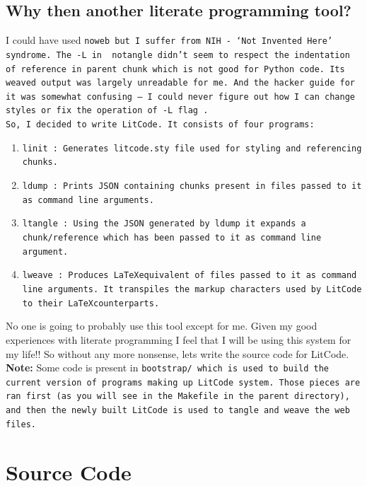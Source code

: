 \subsection{Why then another literate programming tool?}

I could have used \tt noweb \rm but I suffer from NIH - `Not Invented Here' syndrome. The \tt -L \rm in \tt
notangle \rm didn't seem to respect the indentation of reference in parent chunk which is not good for Python
code. Its weaved output was largely unreadable for me. And the hacker guide for it was somewhat confusing ---
I could never figure out how I can change styles or fix the operation of \tt -L \rm
flag \cite{ramsey1992noweb}.\\

So, I decided to write LitCode. It consists of four programs:
\begin{enumerate}
    \item \tt linit \rm: Generates \tt litcode.sty \rm file used for styling and referencing chunks.
    \item \tt ldump \rm: Prints JSON containing chunks present in files passed to it as command line
    arguments.
    \item \tt ltangle \rm: Using the JSON generated by \tt ldump \rm it expands a chunk/reference which has
    been passed to it as command line argument.
    \item \tt lweave \rm: Produces \LaTeX equivalent of files passed to it as command line arguments. It
    transpiles the markup characters used by LitCode to their \LaTeX counterparts.
\end{enumerate}

No one is going to probably use this tool except for me. Given my good experiences with literate programming I
feel that I will be using this system for my life!! So without any more nonsense, lets write the source code
for LitCode.\\

\textbf{Note:} Some code is present in \tt bootstrap/ \rm which is used to build the current version of
programs making up LitCode system. Those pieces are ran first (as you will see in the \tt Makefile \rm in the
parent directory), and then the newly built LitCode is used to tangle and weave the \tt web \rm files.\section{Source Code}

